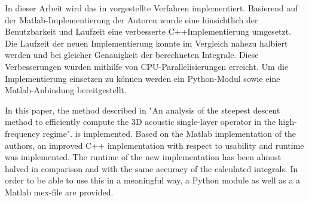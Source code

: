 \kurzfassung



In dieser Arbeit wird das in  vorgestellte Verfahren implementiert. Basierend auf der Matlab-Implementierung der Autoren wurde eine hinsichtlich der Benutzbarkeit und Laufzeit eine verbesserte C++Implementierung umgesetzt.
Die Laufzeit der neuen Implementierung konnte im Vergleich nahezu halbiert werden und bei gleicher Genauigkeit der berechneten Integrale.  
Diese Verbesserungen wurden mithilfe von CPU-Parallelisierungen erreicht. 
Um die Implementierung einsetzen zu können werden ein Python-Modul sowie eine Matlab-Anbindung bereitgestellt.


\kurzfassungEN

In this paper, the method described in "An analysis of the steepest descent method to efficiently compute the 3D acoustic single-layer operator in the high-frequency regime".
is implemented. Based on the Matlab implementation of the
authors, an improved C++ implementation with respect to usability and runtime was implemented. The runtime of the new implementation has been
almost halved in comparison and with the same accuracy of the calculated
integrals. In order to be able to use this in a meaningful way, a Python module as well as a
a Matlab mex-file are provided.